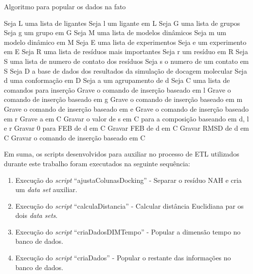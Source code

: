 \begin{algorithm}[H]
\caption{Algoritmo para popular os dados na fato}
\label{alg:criaDadosFato}
{\fontsize{10}{10}\selectfont
\begin{algorithmic}[1]
	\STATE Seja L uma lista de ligantes
	\STATE Seja l um ligante em L
	\STATE Seja G uma lista de grupos
	\STATE Seja g um grupo em G
	\STATE Seja M uma lista de modelos dinâmicos
	\STATE Seja m um modelo dinâmico em M
	\STATE Seja E uma lista de experimentos
	\STATE Seja e um experimento em E
	\STATE Seja R uma lista de resíduos mais importantes
	\STATE Seja r um resíduo em R
	\STATE Seja S uma lista de numero de contato dos resíduos
	\STATE Seja s o numero de um contato em S
	\STATE Seja D a base de dados dos resultados da simulação de docagem molecular
	\STATE Seja d uma conformação em D
	\STATE Seja a um agrupamento de d
	\STATE Seja C uma lista de comandos para inserção
		\STATE Grave o comando de inserção baseado em l
	\ENDFOR
		\STATE Grave o comando de inserção baseado em g
        \ENDFOR
		\STATE Grave o comando de inserção baseado em m
        \ENDFOR
		\STATE Grave o comando de inserção baseado em e
        \ENDFOR
		\STATE Grave o comando de inserção baseado em r
	\ENDFOR
		\STATE Grave a em C
				\STATE Gravar o valor de s em C para a composição baseando em d, l e r
			\ENDFOR
				\STATE Gravar 0 para FEB de d em C
			\ELSE
				\STATE Gravar FEB de d em C
			\ENDIF
			\STATE Gravar RMSD de d em C
			\STATE Gravar o comando de inserção baseado em C
		\ENDFOR
	\ENDFOR
\end{algorithmic}
}
\end{algorithm}

Em suma, os scripts desenvolvidos para auxiliar no processo de ETL utilizados durante este trabalho foram executados na seguinte sequência:
\begin{enumerate}
    \item Execução do \emph{script} ``ajustaColunasDocking'' - Separar o resíduo NAH e cria um \emph{data set} auxiliar.
    \item Execução do \emph{script} ``calculaDistancia'' - Calcular distância Euclidiana par os dois \emph{data sets}.
    \item Execução do \emph{script} ``criaDadosDIMTempo'' - Popular a dimensão tempo no banco de dados.
    \item Execução do \emph{script} ``criaDados'' - Popular o restante das informações no banco de dados.
\end{enumerate}


